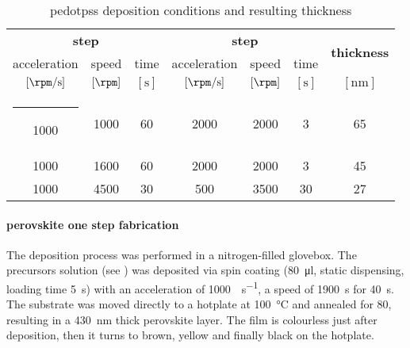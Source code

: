		\begin{table}%
			\caption{\Gls{pedotpss} deposition conditions and resulting thickness}\label{pedotpss_thickness}
			\begin{center}
				\begin{tabular}{c c c | c c c | c}
					\multicolumn{3}{c|}{\textbf{\nth{1} step}} & \multicolumn{3}{c|}{\textbf{\nth{2} step}} & \multirow{2}{*}{\textbf{thickness}}                                                                    \\
					acceleration                               & speed                                      & time                                & acceleration        & speed         & time        &              \\
					$[\si{\rpm\per\s}]$                        & $[\si{\rpm}]$                              & $[\si{\s}]$                         & $[\si{\rpm\per\s}]$ & $[\si{\rpm}]$ & $[\si{\s}]$ & $[\si{\nm}]$ \\
					\hline
					\rule[0ex]{-4pt}{3ex}
					1000                                       & 1000                                       & 60                                  & 2000                & 2000          & 3           & 65           \\
					1000                                       & 1600                                       & 60                                  & 2000                & 2000          & 3           & 45           \\
					1000                                       & 4500                                       & 30                                  & 500                 & 3500          & 30          & 27           \\
				\end{tabular}
			\end{center}
		\end{table}

		\paragraph{ perovskite one step fabrication}
		The deposition process was performed in a nitrogen-filled glovebox.
		The precursors solution (see ) was deposited via spin coating (\SI{80}{\ul}, static dispensing, loading time \SI{5}{\s}) with an acceleration of \SI{1000}{\rpm\per\s}, a speed of \SI{1900}{\s} for \SI{40}{\s}. The substrate was moved directly to a hotplate at \SI{100}{\celsius} and annealed for \SI{80}{\min}, resulting in a \SI{430}{\nm} thick perovskite layer. The film is colourless just after deposition, then it turns to brown, yellow and finally black on the hotplate.

